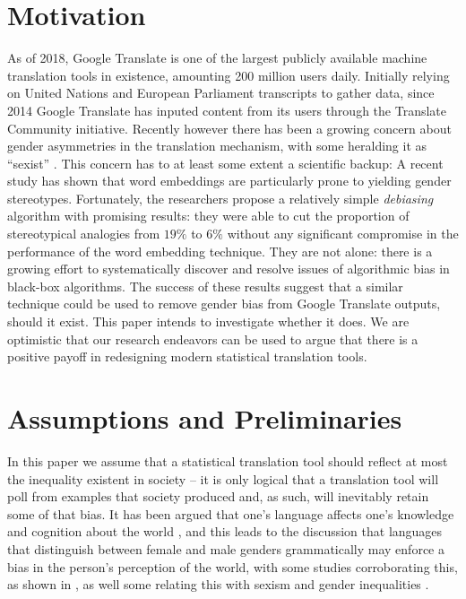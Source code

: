 \documentclass[twoside,11pt]{article}
\begin{document}
\section{Motivation}

As of 2018, Google Translate is one of the largest publicly available machine translation tools in existence, amounting 200 million users daily\cite{Gtranslate200daily2017}. Initially relying on United Nations and European Parliament transcripts to gather data, since 2014 Google Translate has inputed content from its users through the Translate Community initiative\cite{TranslateCommunity}. Recently however there has been a growing concern about gender asymmetries in the translation mechanism, with some heralding it as ``sexist'' \cite{AlgorithmGtranslateSexist2018}. This concern has to at least some extent a scientific backup: A recent study has shown that word embeddings are particularly prone to yielding gender stereotypes\cite{bolukbasi2016man}. Fortunately, the researchers propose a relatively simple \emph{debiasing} algorithm with promising results: they were able to cut the proportion of stereotypical analogies from $19\%$ to $6\%$ without any significant compromise in the performance of the word embedding technique. They are not alone: there is a growing effort to systematically discover and resolve issues of algorithmic bias in black-box algorithms\cite{hajian2016algorithmic}. The success of these results suggest that a similar technique could be used to remove gender bias from Google Translate outputs, should it exist. This paper intends to investigate whether it does. We are optimistic that our research endeavors can be used to argue that there is a positive payoff in redesigning modern statistical translation tools.

\section{Assumptions and Preliminaries}

In this paper we assume that a statistical translation tool should reflect at most the inequality existent in society -- it is only logical that a translation tool will poll from examples that  society produced and, as such, will inevitably retain some of that bias. It has been argued that one's language affects one's knowledge and cognition about the world \cite{kay1984sapir}, and this leads to the discussion that languages that distinguish between female and male genders grammatically may enforce a bias in the person's perception of the world, with some studies corroborating this, as shown in \cite{boroditsky2003sex}, as well some relating this with sexism \cite{thompson2014linguistic} and gender inequalities \cite{santacreu2013female}.
\end{document}
